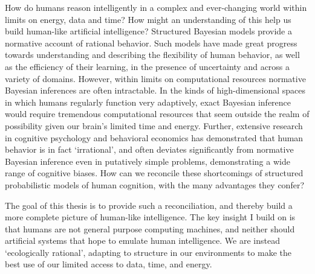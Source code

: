 

How do humans reason intelligently in a complex and ever-changing world within limits on energy, data and time? How might an understanding of this help us build human-like artificial intelligence? Structured Bayesian models provide a normative account of rational behavior. Such models have made great progress towards understanding and describing the flexibility of human behavior, as well as the efficiency of their learning, in the presence of uncertainty and across a variety of domains. However, within limits on computational resources normative Bayesian inferences are often intractable. In the kinds of high-dimensional spaces in which humans regularly function very adaptively, exact Bayesian inference would require tremendous computational resources that seem outside the realm of possibility given our brain's limited time and energy.
Further, extensive research in cognitive psychology and behavioral economics has demonstrated that human behavior is in fact `irrational', and often deviates significantly from normative Bayesian inference even in putatively simple problems, demonstrating a wide range of cognitive biases. How can we reconcile these shortcomings of structured probabilistic models of human cognition, with the many advantages they confer? %

The goal of this thesis is to provide such a reconciliation, and thereby build a more complete picture of human-like intelligence. The key insight I build on is that humans are not general purpose computing machines, and neither should artificial systems that hope to emulate human intelligence. We are instead `ecologically rational', adapting to structure in our environments to make the best use of our limited access to data, time, and energy. 



